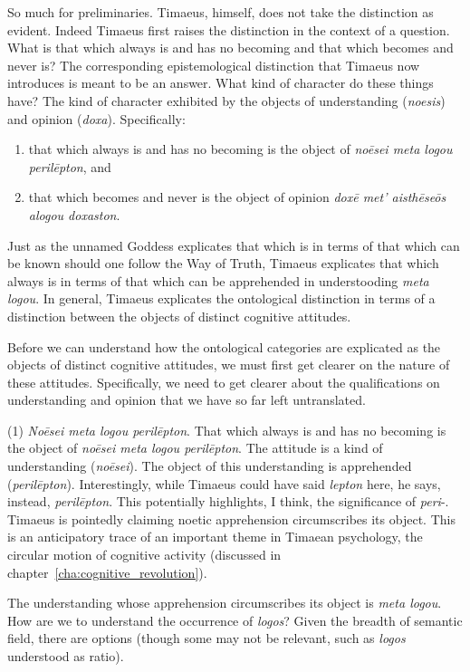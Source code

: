 So much for preliminaries. Timaeus, himself, does not take the distinction as evident. Indeed Timaeus first raises the distinction in the context of a question. What is that which always is and has no becoming and that which becomes and never is? The corresponding epistemological distinction that Timaeus now introduces is meant to be an answer.  What kind of character do these things have? The kind of character exhibited by the objects of understanding (\emph{noesis}) and opinion (\emph{doxa}). Specifically: 
\begin{enumerate}[(1)]
	\item that which always is and has no becoming is the object of \emph{noēsei meta logou perilēpton}, and
	\item that which becomes and never is the object of opinion \emph{doxē met' aisthēseōs alogou doxaston}.
\end{enumerate}
Just as the unnamed Goddess explicates that which is in terms of that which can be known should one follow the Way of Truth, Timaeus explicates that which always is in terms of that which can be apprehended in understooding \emph{meta logou}. In general, Timaeus explicates the ontological distinction in terms of a distinction between the objects of distinct cognitive attitudes.

Before we can understand how the ontological categories are explicated as the objects of distinct cognitive attitudes, we must first get clearer on the nature of these attitudes. Specifically, we need to get clearer about the qualifications on understanding and opinion that we have so far left untranslated. 

(1) \emph{Noēsei meta logou perilēpton}. That which always is and has no becoming is the object of \emph{noēsei meta logou perilēpton}. The attitude is a kind of understanding (\emph{noēsei}). The object of this understanding is apprehended (\emph{perilēpton}). Interestingly, while Timaeus could have said \emph{lepton} here, he says, instead, \emph{perilēpton}. This potentially highlights, I think, the significance of \emph{peri}-. Timaeus is pointedly claiming noetic apprehension circumscribes its object. This is an anticipatory trace of an important theme in Timaean psychology, the circular motion of cognitive activity (discussed in chapter~\ref{cha:cognitive_revolution}).

The understanding whose apprehension circumscribes its object is \emph{meta logou}. How are we to understand the occurrence of \emph{logos}? Given the breadth of semantic field, there are options (though some may not be relevant, such as \emph{logos} understood as ratio). 

